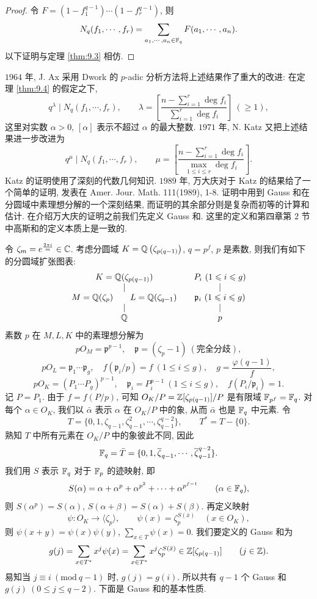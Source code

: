\begin{proof}
令 $F=(1-f_1^{q-1})\cdots(1-f_r^{q-1})$, 则
\[
  N_q(f_1,\cdots,f_r)=\sum_{a_1,\cdots,a_n\in\mathbb{F}_q}F(a_1,\cdots,a_n).
\]
以下证明与定理 \ref{thm:9.3} 相仿.
\end{proof}

$1964$ 年, J. Ax 采用 Dwork 的 $p$-adic 分析方法将上述结果作了重大的改进: 在定理 \ref{thm:9.4} 的假定之下,
\[
  q^{\lambda}\mid N_q(f_1,\cdots,f_r),\qquad
  \lambda=\left[\frac{n-\sum_{i=1}^{r}\deg f_i}{\sum_{i=1}^{r}\deg f_i}\right]\ (\geqslant 1),
\]
这里对实数 $\alpha>0$, $[\alpha]$ 表示不超过 $\alpha$ 的最大整数. $1971$ 年, N. Katz 又把上述结果进一步改进为
\[
  q^{\mu}\mid N_q(f_1,\cdots,f_r),\qquad
  \mu=\left[\frac{n-\sum_{i=1}^{r}\deg f_i}{\max\limits_{1\leqslant i\leqslant r}\deg f_i}\right].
\]
Katz 的证明使用了深刻的代数几何知识. $1989$ 年, 万大庆对于 Katz 的结果给了一个简单的证明, 发表在 Amer. Jour. Math. 111(1989), 1-8. 证明中用到 Gauss 和在分圆域中素理想分解的一个深刻结果, 而证明的其余部分则是复杂而初等的计算和估计. 在介绍万大庆的证明之前我们先定义 Gauss 和. 这里的定义和第四章第 $2$ 节中高斯和的定义本质上是一致的.

令 $\zeta_m=e^{\frac{2\pi i}{m}}\in\mathbb{C}$. 考虑分圆域 $K=\mathbb{Q}\left(\zeta_{p(q-1)}\right)$, $q=p^f$, $p$ 是素数, 则我们有如下的分圆域扩张图表:
\[
  \begin{array}{ccc}
    K=\Q(\zeta_{p(q-1)}) & & P_i\ (1\leqslant i\leqslant g)\\
    \mid & & \mid\\
    M=\Q(\zeta_p)\qquad L=\Q(\zeta_{q-1}) & & \mathfrak{p}_i\ (1\leqslant i\leqslant g)\\
    \mid & & \mid\\
    \Q & & p
  \end{array}
\]
素数 $p$ 在 $M,L,K$ 中的素理想分解为
\[
  pO_M=\mathfrak{p}^{p-1},\quad\mathfrak{p}=(\zeta_p-1)\ (\text{完全分歧}),
\]
\[
  pO_L=\mathfrak{p}_1\cdots\mathfrak{p}_g,\quad f(\mathfrak{p}_i/p)=f\ (1\leqslant i\leqslant g),
  \quad g=\frac{\varphi(q-1)}{f},
\]
\[
  pO_K=(P_1\cdots P_g)^{p-1},\quad\mathfrak{p}_i=P_i^{p-1}\ (1\leqslant i\leqslant g),
  \quad f(P_i/\mathfrak{p}_i)=1.
\]
记 $P=P_1$. 由于 $f=f(P/p)$, 可知 $O_K/P=\mathbb{Z}[\zeta_{p(q-1)}]/P$ 是有限域 $\mathbb{F}_{p^f}=\mathbb{F}_q$. 对每个 $\alpha\in O_K$, 我们以 $\bar{\alpha}$ 表示 $\alpha$ 在 $O_K/P$ 中的象, 从而 $\bar{\alpha}$ 也是 $\mathbb{F}_q$ 中元素. 令
\[
  T=\{0,1,\zeta_{q-1},\zeta_{q-1}^2,\cdots,\zeta_{q-1}^{q-2}\},\qquad T^*=T-\{0\}.
\]
熟知 $T$ 中所有元素在 $O_K/P$ 中的象彼此不同, 因此
\[
  \mathbb{F}_q=\bar{T}=\{0,1,\overline{\zeta}_{q-1},\cdots,\overline{\zeta}_{q-1}^{q-2}\}.
\]
我们用 $S$ 表示 $\mathbb{F}_q$ 对于 $\mathbb{F}_p$ 的迹映射, 即
\[
  S(\alpha)=\alpha+\alpha^p+\alpha^{p^2}+\cdots+\alpha^{p^{f-1}}\qquad(\alpha\in\mathbb{F}_q),
\]
则 $S(\alpha^p)=S(\alpha)$, $S(\alpha+\beta)=S(\alpha)+S(\beta)$. 再定义映射
\[
  \psi\colon O_K\to\langle\zeta_p\rangle,\qquad
  \psi(x)=\zeta_p^{S(\bar{x})}\quad(x\in O_K),
\]
则 $\psi(x+y)=\psi(x)\psi(y)$, $\sum_{x\in T}\psi(x)=0$. 我们要定义的 Gauss 和为
\[
  g(j)=\sum_{x\in T^*}x^j\psi(x)
  =\sum_{x\in T^*}x^j\zeta_p^{S(\bar{x})}\in\mathbb{Z}[\zeta_{p(q-1)}]\qquad(j\in\mathbb{Z}).
\]
易知当 $j\equiv i\ (\mathrm{mod}\ q-1)$ 时, $g(j)=g(i)$. 所以共有 $q-1$ 个 Gauss 和 $g(j)\ (0\leqslant j\leqslant q-2)$. 下面是 Gauss 和的基本性质.

